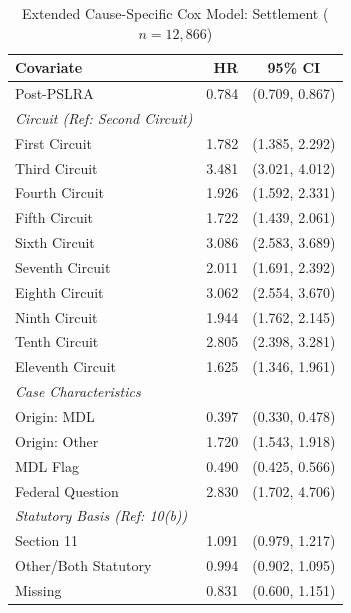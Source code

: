 \begin{table}[tp]
\centering
\caption[Extended Cause-Specific Cox Model: Settlement]{Extended Cause-Specific Cox Model: Settlement ($n = 12{,}866$)}
\label{tab:cox_ext_settle}
\renewcommand{\arraystretch}{1.2}
\begin{tabular*}{\textwidth}{@{\extracolsep{\fill}} l r c @{}}
\toprule
\textbf{Covariate} & \textbf{HR} & \textbf{95\% CI} \\
\midrule
Post-PSLRA            & 0.784 & (0.709, 0.867) \\
\addlinespace[0.5em]
\textit{Circuit (Ref: Second Circuit)} & & \\
First Circuit         &  1.782 & (1.385, 2.292) \\
Third Circuit         &  3.481 & (3.021, 4.012) \\
Fourth Circuit        &  1.926 & (1.592, 2.331) \\
Fifth Circuit         &  1.722 & (1.439, 2.061) \\
Sixth Circuit         &  3.086 & (2.583, 3.689) \\
Seventh Circuit       &  2.011 & (1.691, 2.392) \\
Eighth Circuit        &  3.062 & (2.554, 3.670) \\
Ninth Circuit         &  1.944 & (1.762, 2.145) \\
Tenth Circuit         &  2.805 & (2.398, 3.281) \\
Eleventh Circuit      &  1.625 & (1.346, 1.961) \\
\addlinespace[0.5em]
\textit{Case Characteristics} & & \\
Origin: MDL           &  0.397 & (0.330, 0.478) \\
Origin: Other         &  1.720 & (1.543, 1.918) \\
MDL Flag              &  0.490 & (0.425, 0.566) \\
Federal Question      &  2.830 & (1.702, 4.706) \\
\addlinespace[0.5em]
\textit{Statutory Basis (Ref: 10(b))} & & \\
Section 11            &  1.091 & (0.979, 1.217) \\
Other/Both Statutory  &  0.994 & (0.902, 1.095) \\
Missing               &  0.831 & (0.600, 1.151) \\
\bottomrule
\end{tabular*}
\end{table}

